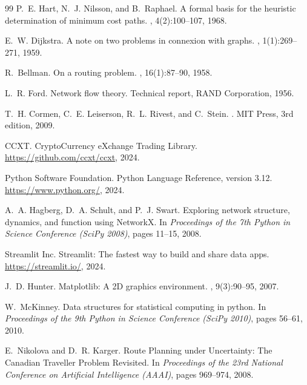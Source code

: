 \begin{thebibliography}{99}
P.~E. Hart, N.~J. Nilsson, and B.~Raphael.
\newblock A formal basis for the heuristic determination of minimum cost paths.
, 4(2):100--107, 1968.

E.~W. Dijkstra.
\newblock A note on two problems in connexion with graphs.
, 1(1):269--271, 1959.

R.~Bellman.
\newblock On a routing problem.
, 16(1):87--90, 1958.

L.~R. Ford.
\newblock Network flow theory.
\newblock Technical report, RAND Corporation, 1956.

T.~H. Cormen, C.~E. Leiserson, R.~L. Rivest, and C.~Stein.
.
\newblock MIT Press, 3rd edition, 2009.

CCXT.
\newblock CryptoCurrency eXchange Trading Library.
\newblock \url{https://github.com/ccxt/ccxt}, 2024.

Python Software Foundation.
\newblock Python Language Reference, version 3.12.
\newblock \url{https://www.python.org/}, 2024.

A.~A. Hagberg, D.~A. Schult, and P.~J. Swart.
\newblock Exploring network structure, dynamics, and function using NetworkX.
\newblock In {\em Proceedings of the 7th Python in Science Conference (SciPy 2008)}, pages 11--15, 2008.

Streamlit Inc.
\newblock Streamlit: The fastest way to build and share data apps.
\newblock \url{https://streamlit.io/}, 2024.

J.~D. Hunter.
\newblock Matplotlib: A 2D graphics environment.
, 9(3):90--95, 2007.

W.~McKinney.
\newblock Data structures for statistical computing in python.
\newblock In {\em Proceedings of the 9th Python in Science Conference (SciPy 2010)}, pages 56--61, 2010.

E.~Nikolova and D.~R. Karger.
\newblock Route Planning under Uncertainty: The Canadian Traveller Problem Revisited.
\newblock In {\em Proceedings of the 23rd National Conference on Artificial Intelligence (AAAI)}, pages 969--974, 2008.


\end{thebibliography}
